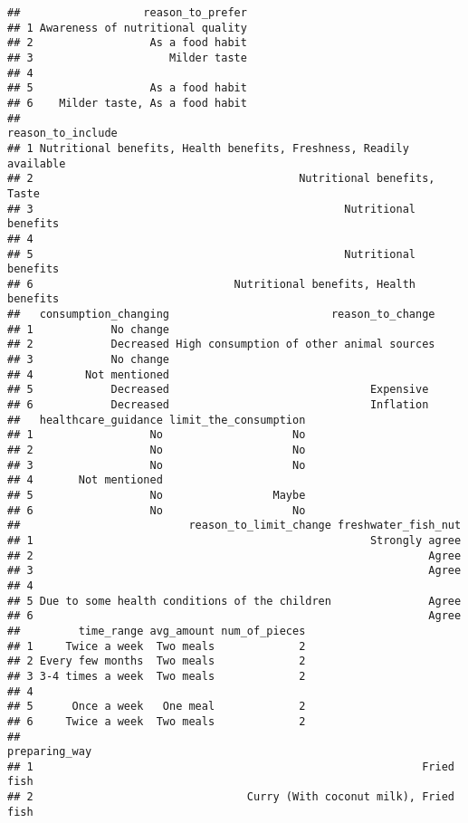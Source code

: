 \documentclass[
]{article}
\begin{document}
\begin{verbatim}
##                   reason_to_prefer
## 1 Awareness of nutritional quality
## 2                  As a food habit
## 3                     Milder taste
## 4                                 
## 5                  As a food habit
## 6    Milder taste, As a food habit
##                                                     reason_to_include
## 1 Nutritional benefits, Health benefits, Freshness, Readily available
## 2                                         Nutritional benefits, Taste
## 3                                                Nutritional benefits
## 4                                                                    
## 5                                                Nutritional benefits
## 6                               Nutritional benefits, Health benefits
##   consumption_changing                         reason_to_change
## 1            No change                                         
## 2            Decreased High consumption of other animal sources
## 3            No change                                         
## 4        Not mentioned                                         
## 5            Decreased                               Expensive 
## 6            Decreased                               Inflation 
##   healthcare_guidance limit_the_consumption
## 1                  No                    No
## 2                  No                    No
## 3                  No                    No
## 4       Not mentioned                      
## 5                  No                 Maybe
## 6                  No                    No
##                          reason_to_limit_change freshwater_fish_nut
## 1                                                    Strongly agree
## 2                                                             Agree
## 3                                                             Agree
## 4                                                                  
## 5 Due to some health conditions of the children               Agree
## 6                                                             Agree
##         time_range avg_amount num_of_pieces
## 1     Twice a week  Two meals             2
## 2 Every few months  Two meals             2
## 3 3-4 times a week  Two meals             2
## 4                                          
## 5      Once a week   One meal             2
## 6     Twice a week  Two meals             2
##                                                           preparing_way
## 1                                                            Fried fish
## 2                                 Curry (With coconut milk), Fried fish

\end{verbatim}
\end{document}
